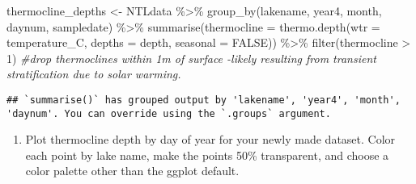 \documentclass[
]{article}
\newenvironment{Shaded}{\begin{snugshade}}{\end{snugshade}}
\newcommand{\AttributeTok}[1]{\textcolor[rgb]{0.77,0.63,0.00}{#1}}
\newcommand{\CommentTok}[1]{\textcolor[rgb]{0.56,0.35,0.01}{\textit{#1}}}
\newcommand{\ConstantTok}[1]{\textcolor[rgb]{0.00,0.00,0.00}{#1}}
\newcommand{\DecValTok}[1]{\textcolor[rgb]{0.00,0.00,0.81}{#1}}
\newcommand{\FloatTok}[1]{\textcolor[rgb]{0.00,0.00,0.81}{#1}}
\newcommand{\FunctionTok}[1]{\textcolor[rgb]{0.00,0.00,0.00}{#1}}
\newcommand{\NormalTok}[1]{#1}
\newcommand{\OtherTok}[1]{\textcolor[rgb]{0.56,0.35,0.01}{#1}}
\newcommand{\SpecialCharTok}[1]{\textcolor[rgb]{0.00,0.00,0.00}{#1}}
\newcommand{\StringTok}[1]{\textcolor[rgb]{0.31,0.60,0.02}{#1}}
\providecommand{\tightlist}{%
  \setlength{\itemsep}{0pt}\setlength{\parskip}{0pt}}
\begin{document}
\begin{Shaded}
\begin{Highlighting}[]
\NormalTok{thermocline\_depths }\OtherTok{\textless{}{-}}\NormalTok{ NTLdata }\SpecialCharTok{\%\textgreater{}\%} \FunctionTok{group\_by}\NormalTok{(lakename, year4, month, daynum, sampledate) }\SpecialCharTok{\%\textgreater{}\%}
                                  \FunctionTok{summarise}\NormalTok{(}\AttributeTok{thermocline =} \FunctionTok{thermo.depth}\NormalTok{(}\AttributeTok{wtr =}\NormalTok{ temperature\_C, }\AttributeTok{depths =}\NormalTok{ depth, }\AttributeTok{seasonal =} \ConstantTok{FALSE}\NormalTok{)) }\SpecialCharTok{\%\textgreater{}\%}
                                  \FunctionTok{filter}\NormalTok{(thermocline }\SpecialCharTok{\textgreater{}} \DecValTok{1}\NormalTok{) }\CommentTok{\#drop thermoclines within 1m of surface {-}likely resulting from transient stratification due to solar warming. }
\end{Highlighting}
\end{Shaded}

\begin{verbatim}
## `summarise()` has grouped output by 'lakename', 'year4', 'month', 'daynum'. You can override using the `.groups` argument.
\end{verbatim}

\begin{enumerate}
\def\labelenumi{\arabic{enumi}.}
\setcounter{enumi}{6}
\tightlist
\item
  Plot thermocline depth by day of year for your newly made dataset.
  Color each point by lake name, make the points 50\% transparent, and
  choose a color palette other than the ggplot default.
\end{enumerate}

\begin{Shaded}
\end{Shaded}
\end{document}
